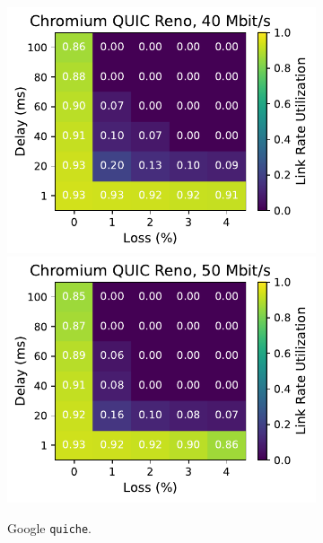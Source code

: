 \begin{figure}[ht]
\begin{subfigure}[b]{0.22\linewidth}
        \includegraphics[width=\linewidth,trim={0 0 2cm 0},clip]{splitting-paper/figures/heatmaps/heatmap_quic_reno_40mbps.pdf}
        \includegraphics[width=\linewidth,trim={0 0 2cm 0},clip]{splitting-paper/figures/heatmaps/heatmap_quic_reno_50mbps.pdf}
        \caption{Google \texttt{quiche}.}
    \end{subfigure}
    \begin{subfigure}[b]{0.22\linewidth}

\end{subfigure}
\end{figure}
